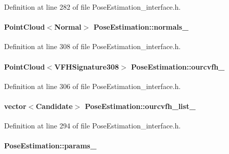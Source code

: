 Definition at line 282 of file Pose\-Estimation\-\_\-interface.\-h.

\hypertarget{classPoseEstimation_ab76eba4186b7a9ea862a266133e831f4}{
\paragraph[{normals\-\_\-}]{\setlength{\rightskip}{0pt plus 5cm}Point\-Cloud$<$Normal$>$ Pose\-Estimation\-::normals\-\_\-\hspace{0.3cm}{\ttfamily [private]}}}\label{classPoseEstimation_ab76eba4186b7a9ea862a266133e831f4}


Definition at line 308 of file Pose\-Estimation\-\_\-interface.\-h.

\hypertarget{classPoseEstimation_aa817cf97641b997de15fef12a263823f}{
\paragraph[{ourcvfh\-\_\-}]{\setlength{\rightskip}{0pt plus 5cm}Point\-Cloud$<$V\-F\-H\-Signature308$>$ Pose\-Estimation\-::ourcvfh\-\_\-\hspace{0.3cm}{\ttfamily [private]}}}\label{classPoseEstimation_aa817cf97641b997de15fef12a263823f}


Definition at line 306 of file Pose\-Estimation\-\_\-interface.\-h.

\hypertarget{classPoseEstimation_a478e06f9c9c3711c26376ce1bcd0ef79}{
\paragraph[{ourcvfh\-\_\-list\-\_\-}]{\setlength{\rightskip}{0pt plus 5cm}vector$<${\bf Candidate}$>$ Pose\-Estimation\-::ourcvfh\-\_\-list\-\_\-\hspace{0.3cm}{\ttfamily [private]}}}\label{classPoseEstimation_a478e06f9c9c3711c26376ce1bcd0ef79}


Definition at line 294 of file Pose\-Estimation\-\_\-interface.\-h.

\hypertarget{classPoseEstimation_a8e62ef2d3f51413b00e6c91aeeab0bfc}{
\paragraph[{params\-\_\-}]{ Pose\-Estimation\-::params\-\_\-\hspace{0.3cm}{\ttfamily [private]}}}\label{classPoseEstimation_a8e62ef2d3f51413b00e6c91aeeab0bfc}


